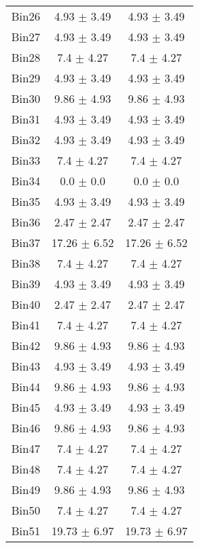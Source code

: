 \begin{tabular}{|c|c|c|}
     Bin26 & 4.93 $\pm$ 3.49 & 4.93 $\pm$ 3.49 \\ \cline{1-3} 
     Bin27 & 4.93 $\pm$ 3.49 & 4.93 $\pm$ 3.49 \\ \cline{1-3} 
     Bin28 & 7.4 $\pm$ 4.27 & 7.4 $\pm$ 4.27 \\ \cline{1-3} 
     Bin29 & 4.93 $\pm$ 3.49 & 4.93 $\pm$ 3.49 \\ \cline{1-3} 
     Bin30 & 9.86 $\pm$ 4.93 & 9.86 $\pm$ 4.93 \\ \cline{1-3} 
     Bin31 & 4.93 $\pm$ 3.49 & 4.93 $\pm$ 3.49 \\ \cline{1-3} 
     Bin32 & 4.93 $\pm$ 3.49 & 4.93 $\pm$ 3.49 \\ \cline{1-3} 
     Bin33 & 7.4 $\pm$ 4.27 & 7.4 $\pm$ 4.27 \\ \cline{1-3} 
     Bin34 & 0.0 $\pm$ 0.0 & 0.0 $\pm$ 0.0 \\ \cline{1-3} 
     Bin35 & 4.93 $\pm$ 3.49 & 4.93 $\pm$ 3.49 \\ \cline{1-3} 
     Bin36 & 2.47 $\pm$ 2.47 & 2.47 $\pm$ 2.47 \\ \cline{1-3} 
     Bin37 & 17.26 $\pm$ 6.52 & 17.26 $\pm$ 6.52 \\ \cline{1-3} 
     Bin38 & 7.4 $\pm$ 4.27 & 7.4 $\pm$ 4.27 \\ \cline{1-3} 
     Bin39 & 4.93 $\pm$ 3.49 & 4.93 $\pm$ 3.49 \\ \cline{1-3} 
     Bin40 & 2.47 $\pm$ 2.47 & 2.47 $\pm$ 2.47 \\ \cline{1-3} 
     Bin41 & 7.4 $\pm$ 4.27 & 7.4 $\pm$ 4.27 \\ \cline{1-3} 
     Bin42 & 9.86 $\pm$ 4.93 & 9.86 $\pm$ 4.93 \\ \cline{1-3} 
     Bin43 & 4.93 $\pm$ 3.49 & 4.93 $\pm$ 3.49 \\ \cline{1-3} 
     Bin44 & 9.86 $\pm$ 4.93 & 9.86 $\pm$ 4.93 \\ \cline{1-3} 
     Bin45 & 4.93 $\pm$ 3.49 & 4.93 $\pm$ 3.49 \\ \cline{1-3} 
     Bin46 & 9.86 $\pm$ 4.93 & 9.86 $\pm$ 4.93 \\ \cline{1-3} 
     Bin47 & 7.4 $\pm$ 4.27 & 7.4 $\pm$ 4.27 \\ \cline{1-3} 
     Bin48 & 7.4 $\pm$ 4.27 & 7.4 $\pm$ 4.27 \\ \cline{1-3} 
     Bin49 & 9.86 $\pm$ 4.93 & 9.86 $\pm$ 4.93 \\ \cline{1-3} 
     Bin50 & 7.4 $\pm$ 4.27 & 7.4 $\pm$ 4.27 \\ \cline{1-3} 
     Bin51 & 19.73 $\pm$ 6.97 & 19.73 $\pm$ 6.97 \\ \cline{1-3} 

\end{tabular}
